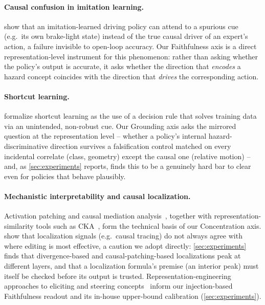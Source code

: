 \paragraph{Causal confusion in imitation learning.}
\citet{dehaan2019causal} show that an imitation-learned driving policy can attend to a
spurious cue (e.g.\ its own brake-light state) instead of the true causal driver of an
expert's action, a failure invisible to open-loop accuracy. Our Faithfulness axis is a
direct representation-level instrument for this phenomenon: rather than asking whether
the policy's output is accurate, it asks whether the direction that \emph{encodes} a
hazard concept coincides with the direction that \emph{drives} the corresponding action.

\paragraph{Shortcut learning.}
\citet{geirhos2020shortcut} formalize shortcut learning as the use of a
decision rule that solves training data via an unintended, non-robust cue. Our Grounding
axis asks the mirrored question at the representation level -- whether a policy's
internal hazard-discriminative direction survives a falsification control matched on
every incidental correlate (class, geometry) except the causal one (relative motion) --
and, as \cref{sec:experiments} reports, finds this to be a genuinely hard bar to clear
even for policies that behave plausibly.

\paragraph{Mechanistic interpretability and causal localization.}
Activation patching and causal mediation analysis~\cite{meng2022rome,vig2020mediation},
together with representation-similarity tools such as CKA~\cite{kornblith2019cka}, form
the technical basis of our Concentration axis. \citet{hase2023localization} show that
localization signals (e.g.\ causal tracing) do not always agree with where editing is
most effective, a caution we adopt directly: \cref{sec:experiments} finds that
divergence-based and causal-patching-based localizations peak at different layers, and
that a localization formula's premise (an interior peak) must itself be checked before
its output is trusted. Representation-engineering approaches to eliciting and steering
concepts~\cite{zou2023repe} inform our injection-based Faithfulness readout and its
in-house upper-bound calibration (\cref{sec:experiments}).

